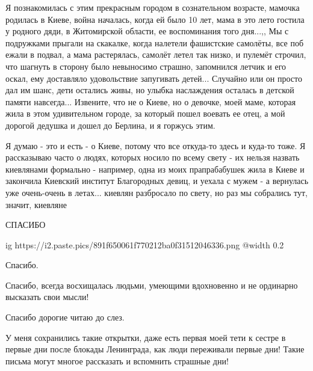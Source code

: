 \begin{itemize}

Я познакомилась с этим прекрасным городом в сознательном возрасте, мамочка
родилась в Киеве, война началась, когда ей было 10 лет, мама в это лето гостила у
родного дяди, в Житомирской области, ее воспоминания того дня...,, Мы с подружками
прыгали на скакалке, когда налетели фашистские самолёты, все поб ежали в подвал, а
мама растерялась, самолёт летел так низко, и пулемёт строчил, что шагнуть в
сторону было невыносимо страшно, запомнился летчик и его оскал, ему доставляло
удовольствие запугивать детей... Случайно или он просто дал им шанс, дети
остались живы, но улыбка наслаждения осталась в детской памяти
навсегда... Извените, что не о Киеве, но о девочке, моей маме, которая жила в этом
удивительном городе, за который пошел воевать ее отец, а мой дорогой дедушка и
дошел до Берлина, и я горжусь этим.

\begin{itemize} %

Я думаю - это и есть - о Киеве, потому что все откуда-то здесь и куда-то тоже.
Я рассказываю часто о людях, которых носило по всему свету - их нельзя назвать
киевлянами формально - например, одна из моих прапрабабушек жила в Киеве и
закончила Киевский институт Благородных девиц, и уехала с мужем - а вернулась
уже очень-очень в летах... киевлян разбросало по свету, но раз мы собрались
тут, значит, киевляне

\end{itemize} %

СПАСИБО


\ifcmt
  ig https://i2.paste.pics/891f650061f770212ba0f31512046336.png
  @width 0.2
\fi


Спасибо.


Спасибо, всегда восхищалась людьми, умеющими вдохновенно и не ординарно
высказать свои мысли!

Спасибо дорогие читаю до слез.


У меня сохранились такие открытки, даже есть первая моей тети к сестре в первые
дни после блокады Ленинграда, как люди переживали первые дни! Такие письма
могут многое рассказать и вспомнить страшные дни!




\end{itemize}
